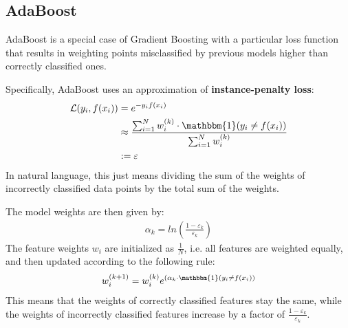 \documentclass{report}
\renewcommand\epsilon{\varepsilon}
\newcommand{\tbf}{\textbf}
\newcommand*{\newpar}{\par\vspace{\baselineskip}\noindent}
\newcommand{\loss}{\mathcal{L}}
\begin{document}
\subsection{AdaBoost}
AdaBoost is a special case of Gradient Boosting with a particular loss function that results in
weighting points misclassified by previous models higher than correctly classified ones.
\newpar
Specifically, AdaBoost uses an approximation of \tbf{instance-penalty loss}:
\begin{align}
 \loss(y_i, f(x_i)) &= e^{-y_i f(x_i)}\\
 &\approx \frac{\sum_{i=1}^N w^{(k)}_i \cdot \mathbbm{1}(y_i \neq f(x_i))}{\sum_{i=1}^N w^{(k)}_i}\\ &:= \epsilon
\end{align}
In natural language, this just means dividing the sum of the weights of incorrectly classified data points by the total sum of the weights.
\newpar
The model weights are then given by:
\begin{align}
 \alpha_k = ln\left(\frac{1 - \epsilon_k}{\epsilon_k}\right)
\end{align}
The feature weights $w_i$ are initialized as $\frac{1}{N}$, i.e. all features are weighted equally, and then updated according to the following rule:
\begin{align}
w_i^{(k+1)} = w_i^{(k)} e^{(\alpha_k \cdot \mathbbm{1}(y_i \neq f(x_i))}
\end{align}
This means that the weights of correctly classified features stay the same, while the weights of incorrectly classified features increase by a factor of $\frac{1 - \epsilon_k}{\epsilon_k}$.
%
\end{document}
